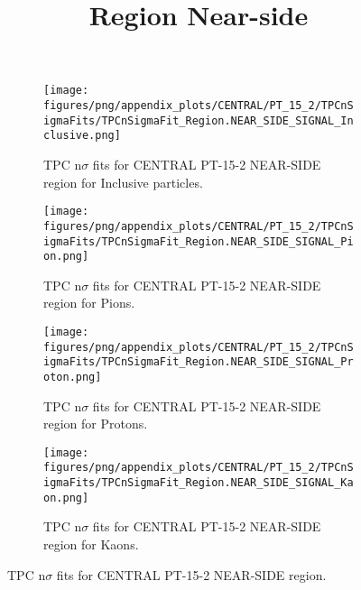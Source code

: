             \begin{figure}[H]
                \title{Region Near-side}
                \begin{subfigure}[b]{0.5\textwidth}
                    \centering
                    \texttt{[image: figures/png/appendix\_plots/CENTRAL/PT\_15\_2/TPCnSigmaFits/TPCnSigmaFit\_Region.NEAR\_SIDE\_SIGNAL\_Inclusive.png]}
                    \caption{TPC n$\sigma$ fits for CENTRAL PT-15-2 NEAR-SIDE region for Inclusive particles.}
                    \label{fig:appendix_CENTRAL_PT-15-2_NEAR_SIDE_SIGNAL_Inclusive}
                \end{subfigure}
                \begin{subfigure}[b]{0.5\textwidth}
                    \centering
                    \texttt{[image: figures/png/appendix\_plots/CENTRAL/PT\_15\_2/TPCnSigmaFits/TPCnSigmaFit\_Region.NEAR\_SIDE\_SIGNAL\_Pion.png]}
                    \caption{TPC n$\sigma$ fits for CENTRAL PT-15-2 NEAR-SIDE region for Pions.}
                    \label{fig:appendix_CENTRAL_PT-15-2_NEAR_SIDE_SIGNAL_Pion}
                \end{subfigure}
                \begin{subfigure}[b]{0.5\textwidth}
                    \centering
                    \texttt{[image: figures/png/appendix\_plots/CENTRAL/PT\_15\_2/TPCnSigmaFits/TPCnSigmaFit\_Region.NEAR\_SIDE\_SIGNAL\_Proton.png]}
                    \caption{TPC n$\sigma$ fits for CENTRAL PT-15-2 NEAR-SIDE region for Protons.}
                    \label{fig:appendix_CENTRAL_PT-15-2_NEAR_SIDE_SIGNAL_Proton}
                \end{subfigure}
                \begin{subfigure}[b]{0.5\textwidth}
                    \centering
                    \texttt{[image: figures/png/appendix\_plots/CENTRAL/PT\_15\_2/TPCnSigmaFits/TPCnSigmaFit\_Region.NEAR\_SIDE\_SIGNAL\_Kaon.png]}
                    \caption{TPC n$\sigma$ fits for CENTRAL PT-15-2 NEAR-SIDE region for Kaons.}
                    \label{fig:appendix_CENTRAL_PT-15-2_NEAR_SIDE_SIGNAL_Kaon}
                \end{subfigure}
                \caption{TPC n$\sigma$ fits for CENTRAL PT-15-2 NEAR-SIDE region.}
                \label{fig:appendix_CENTRAL_PT-15-2_NEAR_SIDE_SIGNAL}
            \end{figure}

